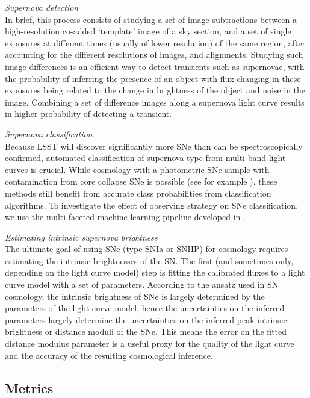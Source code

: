 {\emph{Supernova detection}}\\
In brief, this process consists of studying a set of image subtractions
between a high-resolution co-added `template' image of a sky section, and a set of
single exposures at different times (usually of lower resolution) of the
same region, after accounting for the different resolutions of images, and
alignments. Studying such image differences is an efficient way to detect
transients such as supernovae, with the probability of inferring the presence
of an object with flux changing in these exposures being related to the change in 
brightness of the object and noise in the image. Combining a set of difference images 
along a supernova light curve results in higher probability of detecting a transient. 

{\emph{Supernova classification}}\\
Because LSST will discover significantly more SNe than can be spectroscopically confirmed, 
automated classification of supernova type from multi-band light curves is crucial. While cosmology 
with a photometric SNe sample with contamination from core collapse SNe is possible (see for 
example \citet{Kunz2007,Newling2011,Hlozek2012,Knights2013,Bernstein2012,Campbell2013,Rubin2015}), 
these methods still benefit from accurate class probabilities from classification algorithms. To 
investigate the effect of observing strategy on SNe classification, we use the multi-faceted machine 
learning pipeline developed in \citet{Lochner2016}.


{\emph{Estimating intrinsic supernova brightness}}\\
The ultimate goal of using SNe (type SNIa or
SNIIP) for cosmology requires estimating the intrinsic brightnesses of
the SN. The first (and sometimes only, depending on the light curve
model) step is fitting the calibrated fluxes to a light curve model with
a set of parameters. According to the ansatz used in SN cosmology, the
intrinsic brightness of SNe is largely determined by the parameters of
the light curve model; hence the uncertainties on the inferred
parameters largely determine the uncertainties on the inferred peak
intrinsic brightness or distance moduli of the SNe. This means the error on the fitted distance 
modulus parameter is a useful proxy for the quality of the light curve and the accuracy of 
the resulting cosmological inference.



\subsection{Metrics}
\label{sec:\secname:metrics}


